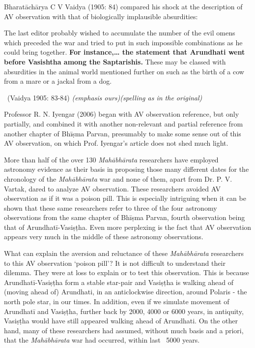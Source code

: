 Bharatāchārya C V Vaidya (1905: 84) compared his shock at the description of AV observation with that of biologically implausible absurdities:

\begin{myquote}
The last editor probably wished to accumulate the number of the evil omens which preceded the war and tried to put in such impossible combinations as he could bring together. \textbf{For instance,… the statement that Arundhati went before Vasishtha among the Saptarishis.} These may be classed with absurdities in the animal world mentioned further on such as the birth of a cow from a mare or a jackal from a dog. 

~\hfill (Vaidya 1905: 83-84) \textit{(emphasis ours)(spelling as in the original)}
\end{myquote}

\newpage

Professor R. N. Iyengar (2006) began with AV observation reference, but only partially, and combined it with another non-relevant and partial reference from another chapter of Bhīṣma Parvan, presumably to make some sense out of this AV observation, on which Prof. Iyengar’s article does not shed much light.

More than half of the over 130 \textit{Mahābhārata} researchers have employed astronomy evidence as their basis in proposing those many different dates for the chronology of the \textit{Mahābhārata} war and none of them, apart from Dr. P. V. Vartak, dared to analyze AV observation. These researchers avoided AV observation as if it was a poison pill. This is especially intriguing when it can be shown that these same researchers refer to three of the four astronomy observations from the same chapter of Bhīṣma Parvan, fourth observation being that of Arundhatī-Vasiṣṭha. Even more perplexing is the fact that AV observation appears very much in the middle of these astronomy observations.

What can explain the aversion and reluctance of these \textit{Mahābhārata} researchers to this AV observation ‘poison pill’? It is not difficult to understand their dilemma. They were at loss to explain or to test this observation. This is because Arundhatī-Vasiṣṭha form a stable star-pair and Vasiṣṭha is walking ahead of (moving ahead of) Arundhati, in an anticlockwise direction, around Polaris - the north pole star, in our times. In addition, even if we simulate movement of Arundhatī and Vasiṣṭha, further back by 2000, 4000 or 6000 years, in antiquity, Vasiṣṭha would have still appeared walking ahead of Arundhati. On the other hand, many of these researchers had assumed, without much basis and a priori, that the \textit{Mahābhārata} war had occurred, within last ~5000 years.

